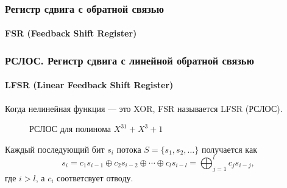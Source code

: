 \begin{frame}
    \frametitle{Регистр сдвига с обратной связью}
    \framesubtitle{FSR (Feedback Shift Register)}
    
    \begin{figure}
        \begin{center}
        \end{center}
    \end{figure} 
\end{frame}


\begin{frame}
    \frametitle{РСЛОС. Регистр сдвига с \alert{линейной} обратной связью}
    \framesubtitle{LFSR (Linear Feedback Shift Register)}
    
    Когда нелинейная функция --- это XOR, FSR называется LFSR (РСЛОС).
    \begin{figure}
        \begin{center}
        \end{center}
        \caption{РСЛОС для полинома $X^{31}+X^3+1$}\label{pict:lfsr}
    \end{figure} 
    Каждый последующий бит $s_i$ потока $S=\{s_1,s_2,\ldots\}$ получается как
    \[s_i=c_1s_{i-1}\oplus c_2s_{i-2}\oplus\cdots\oplus c_ls_{i-l}=\bigoplus_{j=1}^{l}c_js_{i-j},\]
    где $i>l$, а $c_i$ соответсвует отводу.
\end{frame}


